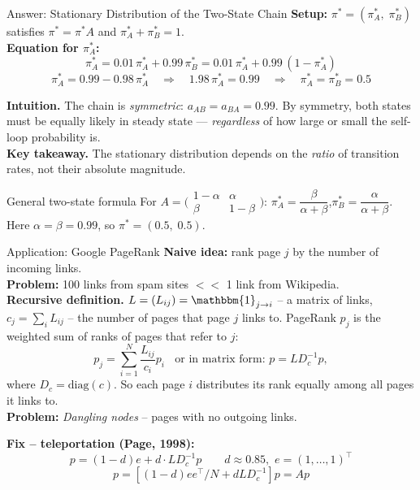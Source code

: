 \documentclass[aspectratio=169,t]{beamer}
\begin{document}
\begin{frame}{Answer: Stationary Distribution of the Two-State Chain}
  \textbf{Setup:} $\pi^* = (\pi^*_A,\; \pi^*_B)$ satisfies $\pi^* = \pi^* A$ and $\pi^*_A + \pi^*_B = 1$.\\[0.3cm]
  \textbf{Equation for $\pi^*_A$:}
  $$\pi^*_A = 0.01\,\pi^*_A + 0.99\,\pi^*_B = 0.01\,\pi^*_A + 0.99\,(1-\pi^*_A)$$
  $$\pi^*_A = 0.99 - 0.98\,\pi^*_A \quad\Longrightarrow\quad 1.98\,\pi^*_A = 0.99
  \quad\Longrightarrow\quad \boxed{\pi^*_A = \pi^*_B = 0.5}$$

  \vspace{0.2cm}
  \textbf{Intuition.} The chain is \emph{symmetric}: $a_{AB} = a_{BA} = 0.99$. By symmetry, both states must be equally likely in steady state — \emph{regardless} of how large or small the self-loop probability is.\\[0.2cm]

  \textbf{Key takeaway.} The stationary distribution depends on the \emph{ratio} of transition rates, not their absolute magnitude.

  \begin{block}{General two-state formula}
    For $A = \bigl(\begin{smallmatrix}1-\alpha & \alpha \\ \beta & 1-\beta\end{smallmatrix}\bigr)$:\quad
    $\pi^*_A = \dfrac{\beta}{\alpha+\beta}$,\quad $\pi^*_B = \dfrac{\alpha}{\alpha+\beta}$.
    \;Here $\alpha=\beta=0.99$, so $\pi^* = (0.5,\;0.5)$.
  \end{block}
\end{frame}

\begin{frame}{Application: Google PageRank}
  \textbf{Naive idea:} rank page $j$ by the number of incoming links.\\[0.1cm]
  \textbf{Problem:} 100 links from spam sites $<<$ 1 link from Wikipedia.\\[0.25cm]
  
  \textbf{Recursive definition.}
  $L = (L_{ij}) = \mathbbm{1}_{j\to i}$ -- a matrix of links, $c_j = \sum_i L_{ij}$ -- the number of pages that page $j$ links to.
  PageRank $p_j$ is the weighted sum of ranks of pages that refer to $j$:
  $$p_j = \sum_{i=1}^N \frac{L_{ij}}{c_i} p_i \;\;\text{ or in matrix form: } p = L D^{-1}_c p,$$
  where $D_c = \text{diag}(c)$. So each page $i$ distributes its rank equally among all pages it links to. \\[0.25cm]

  \textbf{Problem:} \emph{Dangling nodes} -- pages with no outgoing links.

  \textbf{Fix -- teleportation (Page, 1998):}
  $$p = (1-d)e + d\cdot LD^{-1}_c p \qquad d\approx 0.85, \,\, e = (1, \ldots, 1)^\top$$
  $$p = \left[(1-d)ee^\top/N + dLD^{-1}_c\right]p = Ap$$
\end{frame}
\end{document}
